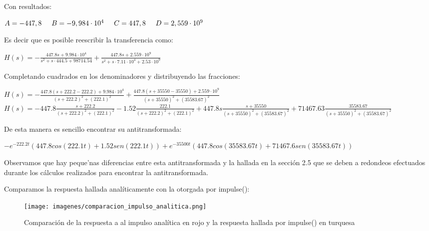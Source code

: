 \documentclass[12pt, titlepage]{article}
\begin{document}
    Con resultados:
    \begin{center}
        $A=-447,8 \hspace{5mm}
        B=-9,984\cdot10^4 \hspace{5mm}
        C=447,8 \hspace{5mm}
        D=2,559\cdot10^9$
    \end{center}
  
    Es decir que es posible reescribir la transferencia como:
    \begin{center}
                $H(s) = -\frac{447.8s+9.984\cdot10^4}{s^2+ s \cdot 444.5 + 98714.54} +  \frac{447.8s+2.559\cdot10^9}{s^2 +s \cdot 7.11\cdot 10^{4} + 2.53\cdot10^{9}}$
    \end{center}
    
    Completando cuadrados en los denominadores y distribuyendo las fracciones:
    
    
    \begin{center}
            $H(s) = -\frac{447.8(s+222.2-222.2)+9.984\cdot10^4}{(s+222.2)^2 + (222.1)^2} +  \frac{447.8(s+35550-35550)+2.559\cdot10^9}{(s+35550)^2  + (35583.67)^2}$\\
            \vspace{5mm}
            $H(s) = - 447.8\frac{s+222.2}{(s+222.2)^2 + (222.1)^2} -1.52\frac{222.1}{(s+222.2)^2 + (222.1)^2} + 447.8s\frac{s+35550}{(s+35550)^2  + (35583.67)^2} + 71467.63 \frac{35583.67}{(s+35550)^2  + (35583.67)^2} $
    \end{center}
    
    De esta manera es sencillo encontrar su antitransformada:
    \begin{center}
        \small $-e^{-222.2t}(447.8cos(222.1t)+1.52sen(222.1t)) + e^{-35500t}(447.8cos(35583.67t)+71467.6sen(35583.67t))$
    \end{center}

    Observamos que hay peque'nas diferencias entre esta antitransformada y la hallada en la sección 2.5 que se deben a redondeos efectuados durante los cálculos realizados para encontrar la antitransformada.
    
    Comparamos la respuesta hallada analíticamente con la otorgada por impulse():
    
    \begin{figure}[!htb]
    \texttt{[image: imagenes/comparacion\_impulso\_analitica.png]}
    \centering
    \caption{Comparación de la respuesta a al impulso analítica en rojo y la respuesta hallada por impulse() en turquesa}
    \end{figure}
    
\end{document}
